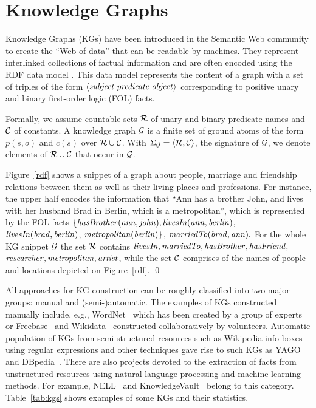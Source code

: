 \section{Knowledge Graphs}
\label{sec:kgs}

Knowledge Graphs (KGs) have been introduced in the Semantic Web community to create the ``Web of data'' that can be readable by machines. They represent interlinked collections of factual information and are often encoded using the RDF data model \cite{rdf2004}. This data model represents the content of a graph with a set of triples of the form $\langle\mathit{subject\;predicate\;object}\rangle$ corresponding to positive unary and binary first-order logic (FOL) facts.  

Formally, we assume countable sets $\mathcal{R}$ of unary and binary predicate names and $\mathcal{C}$ of constants. A knowledge graph $\mathcal{G}$ is a finite set of ground atoms of the form $p(s,o)$ and $c(s)$ over $\mathcal{R} \cup \mathcal{C}$. With $\Sigma_{\mathcal{G}}=\langle\mathcal{R},\mathcal{C}\rangle$, the signature of $\mathcal{G}$, we denote elements of $\mathcal{R} \cup \mathcal{C}$ that occur in $\mathcal{G}$.

\begin{example} Figure~\ref{rdf} shows a snippet of a graph about people, marriage and friendship %
relations between them as well as their living places and professions. For instance, the upper half encodes the information that ``Ann has a brother John, and lives with her husband Brad in Berlin, which is a metropolitan'', which is represented by the FOL facts $\mathit{\{hasBrother(ann, john),}$$\mathit{ livesIn(ann, berlin)}$, \\$\mathit{livesIn(brad, berlin)}$, $\mathit{metropolitan(berlin)}\}$, $\mathit{marriedTo(brad, ann)}.$
For the whole KG snippet $\mathcal{G}$ the set $\mathcal{R}$ contains $\mathit{livesIn,marriedTo,hasBrother,hasFriend,}$\\$\mathit{researcher,metropolitan,artist}$, while the set $\mathcal{C}$ comprises of the names of people and  locations depicted on Figure~\ref{rdf}. \qed
\end{example}



All approaches for KG construction can be roughly classified into two major groups: manual and (semi-)automatic. The examples of KGs constructed manually include, e.g., WordNet~\cite{wordnet} which has been created by a group of experts or Freebase~\cite{Freebase} and Wikidata~\cite{wikidata} constructed collaboratively by volunteers. 
Automatic population of KGs from semi-structured resources such as Wikipedia info-boxes using regular expressions and other techniques gave rise to such KGs as YAGO~\cite{yago} and DBpedia~\cite{dbpedia}. 
There are also projects 
devoted to the extraction of facts from unstructured resources using natural language processing and machine learning methods.  
For example, NELL~\cite{nell} and KnowledgeVault~\cite{KnowledgeVault} belong to this category. Table~\ref{tab:kgs} shows examples of some KGs and their statistics.

